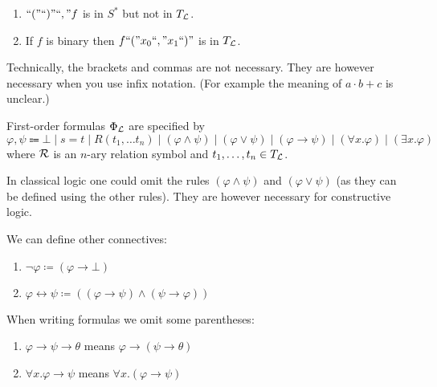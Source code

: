 \begin{example}
    \hfill
    \begin{enumerate}
        \item $\text{``} ( \text{''}\text{``} ) \text{''}\text{``} , \text{''}f$ is in $S^*$ but not in $T_{\mathcal{L}}$. 
        \item If $f$ is binary then $f\text{``} ( \text{''}x_0 \text{``} , \text{''} x_1 \text{``} ) \text{''}$ is in $T_{\mathcal{L}}$.
    \end{enumerate}
\end{example}

\begin{rem}
Technically, the brackets and commas are not necessary. 
They are however necessary when you use infix notation. 
(For example the meaning of $a \cdot b + c$ is unclear.)
\end{rem}

\begin{boxdef}
\begin{defi}
First-order \alert{formulas $\Phi_{\mathcal{L}}$} are specified by
\begin{equation*}
    \varphi, \psi \Coloneqq \bot \mid s = t \mid R(t_1, \dots t_n) \mid (\varphi \wedge \psi) \mid (\varphi \lor \psi) \mid (\varphi \to \psi) \mid (\forall x. \varphi) \mid (\exists x. \varphi)
\end{equation*}
where $\mathcal{R}$ is an $n$-ary relation symbol and $t_1, \dots, t_n \in T_{\mathcal{L}}$.
\end{defi}
\end{boxdef}

\begin{rem}
In classical logic one could omit the rules $(\varphi \wedge \psi)$ and $(\varphi \lor \psi)$ (as they can be defined using the other rules). 
They are however necessary for constructive logic.
\end{rem}

\begin{rem}
We can define other connectives: 
\begin{enumerate}
    \item $\neg \varphi \coloneq (\varphi \to \bot)$
    \item $\varphi \leftrightarrow \psi \coloneq ((\varphi \to \psi) \wedge (\psi \to \varphi))$
\end{enumerate}
\end{rem}

\begin{rem}
When writing formulas we omit some parentheses: 
\begin{enumerate}
    \item $\varphi \to \psi \to \theta$ means $\varphi \to (\psi \to \theta)$
    \item $\forall x. \varphi \to \psi$ means $\forall x. (\varphi \to \psi)$
\end{enumerate}
\end{rem}

